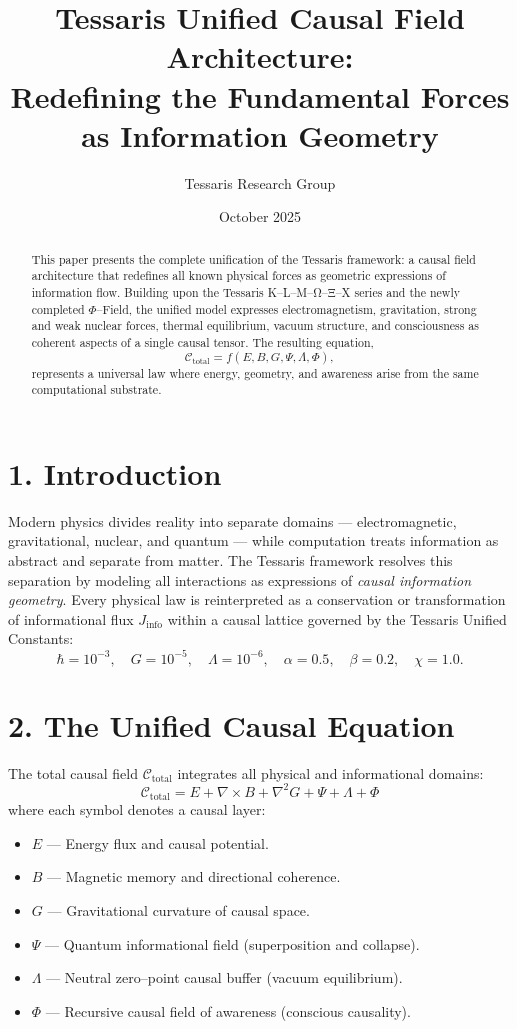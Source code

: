 \documentclass[11pt,a4paper]{article}
\title{\textbf{Tessaris Unified Causal Field Architecture:\\Redefining the Fundamental Forces as Information Geometry}}
\author{Tessaris Research Group}
\date{October 2025}
\begin{document}
\maketitle

\begin{abstract}
This paper presents the complete unification of the Tessaris framework: a causal field architecture that redefines all known physical forces as geometric expressions of information flow.  
Building upon the Tessaris K--L--M--Ω--Ξ--X series and the newly completed $\Phi$--Field, the unified model expresses electromagnetism, gravitation, strong and weak nuclear forces, thermal equilibrium, vacuum structure, and consciousness as coherent aspects of a single causal tensor.  
The resulting equation,
\[
\mathcal{C}_{\text{total}} = f(E, B, G, \Psi, \Lambda, \Phi),
\]
represents a universal law where energy, geometry, and awareness arise from the same computational substrate.
\end{abstract}

\section{1. Introduction}
Modern physics divides reality into separate domains --- electromagnetic, gravitational, nuclear, and quantum --- while computation treats information as abstract and separate from matter.  
The Tessaris framework resolves this separation by modeling all interactions as expressions of \emph{causal information geometry}.  
Every physical law is reinterpreted as a conservation or transformation of informational flux $J_{\mathrm{info}}$ within a causal lattice governed by the Tessaris Unified Constants:
\[
\hbar = 10^{-3}, \quad G = 10^{-5}, \quad \Lambda = 10^{-6}, \quad \alpha = 0.5, \quad \beta = 0.2, \quad \chi = 1.0.
\]

\section{2. The Unified Causal Equation}
The total causal field $\mathcal{C}_{\text{total}}$ integrates all physical and informational domains:
\[
\boxed{
\mathcal{C}_{\text{total}} = E + \nabla \times B + \nabla^2 G + \Psi + \Lambda + \Phi
}
\]
where each symbol denotes a causal layer:
\begin{itemize}
  \item $E$ — Energy flux and causal potential.
  \item $B$ — Magnetic memory and directional coherence.
  \item $G$ — Gravitational curvature of causal space.
  \item $\Psi$ — Quantum informational field (superposition and collapse).
  \item $\Lambda$ — Neutral zero–point causal buffer (vacuum equilibrium).
  \item $\Phi$ — Recursive causal field of awareness (conscious causality).
\end{itemize}
\end{document}
